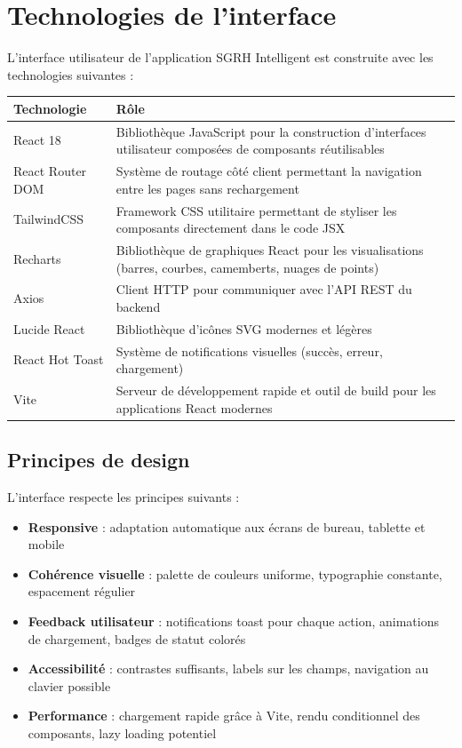 \documentclass[12pt,a4paper]{report}
\begin{document}
\chapter{Technologies de l'interface}

L'interface utilisateur de l'application SGRH Intelligent est construite avec les technologies suivantes :

\begin{longtable}{|p{4cm}|p{9.5cm}|}
\hline
\textbf{Technologie} & \textbf{Rôle} \\
\hline
React 18 & Bibliothèque JavaScript pour la construction d'interfaces utilisateur composées de composants réutilisables \\
\hline
React Router DOM & Système de routage côté client permettant la navigation entre les pages sans rechargement \\
\hline
TailwindCSS & Framework CSS utilitaire permettant de styliser les composants directement dans le code JSX \\
\hline
Recharts & Bibliothèque de graphiques React pour les visualisations (barres, courbes, camemberts, nuages de points) \\
\hline
Axios & Client HTTP pour communiquer avec l'API REST du backend \\
\hline
Lucide React & Bibliothèque d'icônes SVG modernes et légères \\
\hline
React Hot Toast & Système de notifications visuelles (succès, erreur, chargement) \\
\hline
Vite & Serveur de développement rapide et outil de build pour les applications React modernes \\
\hline
\end{longtable}

\section{Principes de design}

L'interface respecte les principes suivants :
\begin{itemize}
    \item \textbf{Responsive} : adaptation automatique aux écrans de bureau, tablette et mobile
    \item \textbf{Cohérence visuelle} : palette de couleurs uniforme, typographie constante, espacement régulier
    \item \textbf{Feedback utilisateur} : notifications toast pour chaque action, animations de chargement, badges de statut colorés
    \item \textbf{Accessibilité} : contrastes suffisants, labels sur les champs, navigation au clavier possible
    \item \textbf{Performance} : chargement rapide grâce à Vite, rendu conditionnel des composants, lazy loading potentiel
\end{itemize}
\end{document}
